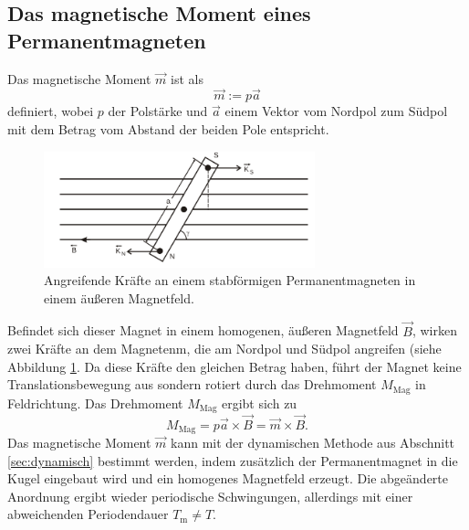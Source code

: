\FloatBarrier
\subsection{Das magnetische Moment eines Permanentmagneten}

Das magnetische Moment $\vec{m}$ ist als
\begin{equation}
	\vec{m} := p \vec{a}
\end{equation}
definiert, wobei $p$ der Polstärke und $\vec{a}$ einem Vektor vom Nordpol zum Südpol mit dem
Betrag vom Abstand der beiden Pole entspricht.
\begin{figure}
	\centering
	\includegraphics[width=0.7\textwidth]{Bilder/Magnet.png}
	\caption{Angreifende Kräfte an einem stabförmigen Permanentmagneten in einem äußeren Magnetfeld. \cite{Anleitung}}
	\label{fig:magnetus}
\end{figure}

Befindet sich dieser Magnet in einem homogenen, äußeren Magnetfeld $\vec{B}$, wirken zwei
Kräfte an dem Magnetenm, die am Nordpol und Südpol angreifen (siehe Abbildung \ref{fig:magnetus}.
Da diese Kräfte den gleichen Betrag haben, führt der Magnet keine Translationsbewegung aus
sondern rotiert durch das Drehmoment $M_{\mathrm{Mag}}$ in Feldrichtung.
Das Drehmoment $M_{\mathrm{Mag}}$ ergibt sich zu
\begin{equation}
	M_{\mathrm{Mag}} = p \vec{a} \times \vec{B} = \vec{m} \times \vec{B} \mathrm{.}
\end{equation}
Das magnetische Moment $\vec{m}$ kann mit der dynamischen Methode aus Abschnitt
\ref{sec:dynamisch} bestimmt werden, indem zusätzlich der Permanentmagnet in die Kugel eingebaut
wird und ein homogenes Magnetfeld erzeugt.
Die abgeänderte Anordnung ergibt wieder periodische Schwingungen, allerdings mit einer
abweichenden Periodendauer $T_{\mathrm{m}} \neq T$.

